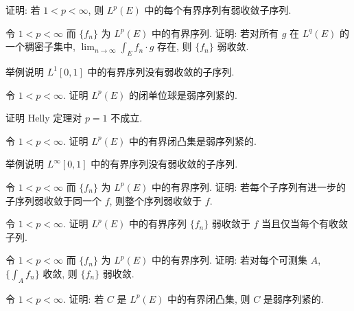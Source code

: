 \documentclass[../../main.tex]{subfiles}
\begin{document}
\begin{exercise}\label{exercise:ch08-27}
证明: 若 $1<p<\infty$, 则 $L^{p}(E)$ 中的每个有界序列有弱收敛子序列.
\end{exercise}

\begin{exercise}\label{exercise:ch08-28}
令 $1<p<\infty$ 而 $\{f_{n}\}$ 为 $L^{p}(E)$ 中的有界序列. 证明: 若对所有 $g$ 在 $L^{q}(E)$ 的一个稠密子集中, $\lim_{n\to\infty}\int_{E}f_{n}\cdot g$ 存在, 则 $\{f_{n}\}$ 弱收敛.
\end{exercise}

\begin{exercise}\label{exercise:ch08-29}
举例说明 $L^{1}[0,1]$ 中的有界序列没有弱收敛的子序列.
\end{exercise}

\begin{exercise}\label{exercise:ch08-30}
令 $1<p<\infty$. 证明 $L^{p}(E)$ 的闭单位球是弱序列紧的.
\end{exercise}

\begin{exercise}\label{exercise:ch08-31}
证明 Helly 定理对 $p=1$ 不成立.
\end{exercise}

\begin{exercise}\label{exercise:ch08-32}
令 $1<p<\infty$. 证明 $L^{p}(E)$ 中的有界闭凸集是弱序列紧的.
\end{exercise}

\begin{exercise}\label{exercise:ch08-33}
举例说明 $L^{\infty}[0,1]$ 中的有界序列没有弱收敛的子序列.
\end{exercise}

\begin{exercise}\label{exercise:ch08-34}
令 $1<p<\infty$ 而 $\{f_{n}\}$ 为 $L^{p}(E)$ 中的有界序列. 证明: 若每个子序列有进一步的子序列弱收敛于同一个 $f$, 则整个序列弱收敛于 $f$.
\end{exercise}

\begin{exercise}\label{exercise:ch08-35}
令 $1<p<\infty$. 证明 $L^{p}(E)$ 中的有界序列 $\{f_{n}\}$ 弱收敛于 $f$ 当且仅当每个有收敛子列.
\end{exercise}

\begin{exercise}\label{exercise:ch08-36}
令 $1<p<\infty$ 而 $\{f_{n}\}$ 为 $L^{p}(E)$ 中的有界序列. 证明: 若对每个可测集 $A$, $\{\int_{A}f_{n}\}$ 收敛, 则 $\{f_{n}\}$ 弱收敛.
\end{exercise}

\begin{exercise}\label{exercise:ch08-37}
令 $1<p<\infty$. 证明: 若 $C$ 是 $L^{p}(E)$ 中的有界闭凸集, 则 $C$ 是弱序列紧的.
\end{exercise}
\end{document}
